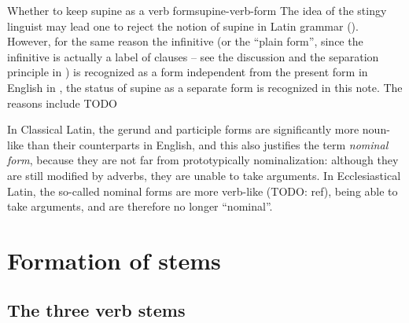 \documentclass[a4paper, oneside, 12pt]{report}
\newcommand*{\citepage}[1]{p.~{#1}}
\newcommand*{\term}[1]{\emph{#1}}
\begin{document}
\begin{infobox}{Whether to keep supine as a verb form}{supine-verb-form}
    The idea of the stingy linguist may lead one to reject the notion of supine in Latin grammar
    ().
    However, for the same reason the infinitive 
    (or the ``plain form'', since the infinitive is actually a label of clauses 
    -- see the discussion and the separation principle in ) 
    is recognized as a form 
    independent from the present form in English in \citet[\citepage{74}]{cgel},
    the status of supine as a separate form is recognized in this note.
    The reasons include TODO
\end{infobox}

In Classical Latin, the gerund and participle forms are significantly more noun-like 
than their counterparts in English,
and this also justifies the term \term{nominal form},
because they are not far from prototypically nominalization:
although they are still modified by adverbs,
they are unable to take arguments.
In Ecclesiastical Latin, 
the so-called nominal forms are more verb-like (TODO: ref),
being able to take arguments,
and are therefore no longer ``nominal''.

\section{Formation of stems}\label{sec:verb-inflection.stem}

\subsection{The three verb stems}\label{sec:three-latin-stem}
\end{document}
